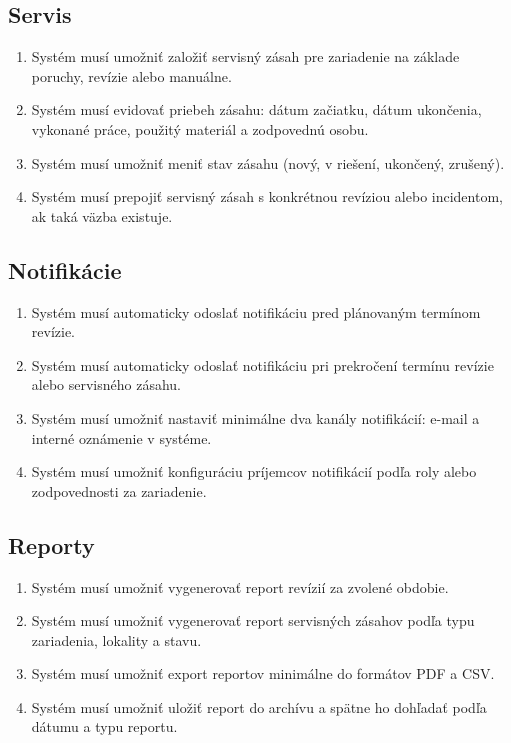 \subsection{Servis}

\begin{enumerate}
\item Systém musí umožniť založiť servisný zásah pre zariadenie na základe poruchy, revízie alebo manuálne.
\item Systém musí evidovať priebeh zásahu: dátum začiatku, dátum ukončenia, vykonané práce, použitý materiál a zodpovednú osobu.
\item Systém musí umožniť meniť stav zásahu (nový, v riešení, ukončený, zrušený).
\item Systém musí prepojiť servisný zásah s konkrétnou revíziou alebo incidentom, ak taká väzba existuje.
\end{enumerate}

\subsection{Notifikácie}

\begin{enumerate}
\item Systém musí automaticky odoslať notifikáciu pred plánovaným termínom revízie.
\item Systém musí automaticky odoslať notifikáciu pri prekročení termínu revízie alebo servisného zásahu.
\item Systém musí umožniť nastaviť minimálne dva kanály notifikácií: e-mail a interné oznámenie v systéme.
\item Systém musí umožniť konfiguráciu príjemcov notifikácií podľa roly alebo zodpovednosti za zariadenie.
\end{enumerate}

\subsection{Reporty}

\begin{enumerate}
\item Systém musí umožniť vygenerovať report revízií za zvolené obdobie.
\item Systém musí umožniť vygenerovať report servisných zásahov podľa typu zariadenia, lokality a stavu.
\item Systém musí umožniť export reportov minimálne do formátov PDF a CSV.
\item Systém musí umožniť uložiť report do archívu a spätne ho dohľadať podľa dátumu a typu reportu.
\end{enumerate}

